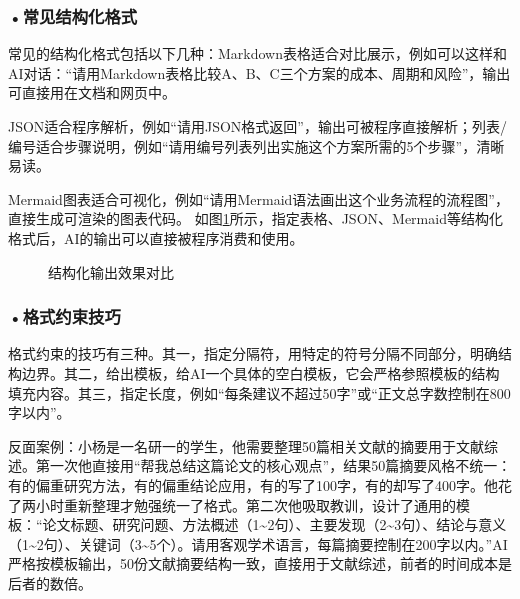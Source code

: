 \subsubsection*{\textbf{•常见结构化格式}}
常见的结构化格式包括以下几种：Markdown表格适合对比展示，例如可以这样和AI对话：“请用Markdown表格比较A、B、C三个方案的成本、周期和风险”，输出可直接用在文档和网页中。

JSON适合程序解析，例如“请用JSON格式返回”，输出可被程序直接解析；列表/编号适合步骤说明，例如“请用编号列表列出实施这个方案所需的5个步骤”，清晰易读。

Mermaid图表适合可视化，例如“请用Mermaid语法画出这个业务流程的流程图”，直接生成可渲染的图表代码。 如图\ref{fig:ch3_3_11}所示，指定表格、JSON、Mermaid等结构化格式后，AI的输出可以直接被程序消费和使用。

\begin{figure}[H]
\centering
{}
\caption{结构化输出效果对比}
\label{fig:ch3_3_11}
\end{figure}


\subsubsection*{\textbf{•格式约束技巧}}


格式约束的技巧有三种。其一，指定分隔符，用特定的符号分隔不同部分，明确结构边界。其二，给出模板，给AI一个具体的空白模板，它会严格参照模板的结构填充内容。其三，指定长度，例如“每条建议不超过50字”或“正文总字数控制在800字以内”。

反面案例：小杨是一名研一的学生，他需要整理50篇相关文献的摘要用于文献综述。第一次他直接用“帮我总结这篇论文的核心观点”，结果50篇摘要风格不统一：有的偏重研究方法，有的偏重结论应用，有的写了100字，有的却写了400字。他花了两小时重新整理才勉强统一了格式。第二次他吸取教训，设计了通用的模板：“论文标题、研究问题、方法概述（1\~{}2句）、主要发现（2\~{}3句）、结论与意义（1\~{}2句）、关键词（3\~{}5个）。请用客观学术语言，每篇摘要控制在200字以内。”AI严格按模板输出，50份文献摘要结构一致，直接用于文献综述，前者的时间成本是后者的数倍。



